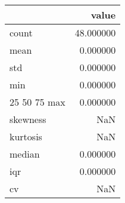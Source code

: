 \begin{tabular}{lr}
\toprule
 & value \\
\midrule
count & 48.000000 \\
mean & 0.000000 \\
std & 0.000000 \\
min & 0.000000 \\
25%
50%
75%
max & 0.000000 \\
skewness & NaN \\
kurtosis & NaN \\
median & 0.000000 \\
iqr & 0.000000 \\
cv & NaN \\
\bottomrule
\end{tabular}
